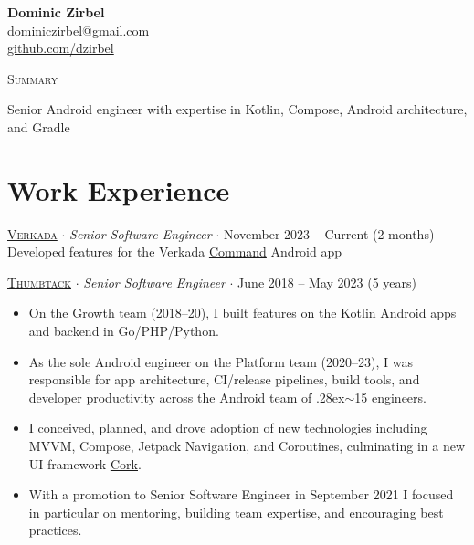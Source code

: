 \documentclass[letterpaper,10pt]{article}
\newcommand{\nicetilde}{\raise.28ex\hbox{$\scriptstyle\sim$}}
\newcommand{\mediumlogo}{\hspace{.75mm}\raisebox{-.15\height}{}\hspace{1mm}}
\begin{document}
\thispagestyle{empty}

\begin{flushright}
    \textbf{\Large{Dominic Zirbel}} \\
    \href{mailto:dominiczirbel@gmail.com}{dominiczirbel@gmail.com} \\
    \href{https://github.com/dzirbel}{ github.com/dzirbel}
\end{flushright}

\begin{minipage}[t]{.115\linewidth}
    {\large{\textsc{Summary}}}
\end{minipage}
\begin{minipage}[t]{.875\linewidth}
    Senior Android engineer with expertise in Kotlin, Compose, Android architecture, and Gradle
\end{minipage}

\section{Work Experience}

\href{https://www.verkada.com/about/}{\textsc{Verkada}} $\cdot$ \textit{Senior Software Engineer} $\cdot$ November 2023 -- Current (2 months) \\
\-\hspace{.28in} Developed features for the Verkada \href{https://play.google.com/store/apps/details?id=com.verkada.android}{Command} Android app

\vspace{6pt}

\href{https://www.thumbtack.com/about}{\textsc{Thumbtack}} $\cdot$ \textit{Senior Software Engineer} $\cdot$ June 2018 -- May 2023 (5 years)
\begin{itemize}[itemsep=2pt, parsep=0pt, partopsep=0pt]
  \item On the Growth team (2018--20), I built features on the Kotlin Android apps and backend in Go/PHP/Python.
  \item As the sole Android engineer on the Platform team (2020--23), I was responsible for app architecture, CI/release pipelines, build tools, and developer productivity across the Android team of \nicetilde15 engineers.
  \item I conceived, planned, and drove adoption of new technologies including MVVM, Compose, Jetpack Navigation, and Coroutines, culminating in a new UI framework \href{https://medium.com/thumbtack-engineering/61a24e5e82b6}{\mediumlogo \underline{Cork}}.
  \item With a promotion to Senior Software Engineer in September 2021 I focused in particular on mentoring, building team expertise, and encouraging best practices.
\end{itemize}
\end{document}
